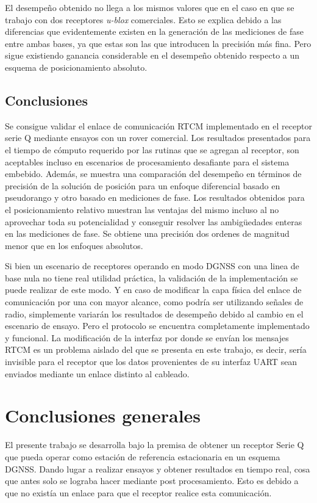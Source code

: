 \documentclass[a4paper,12pt,oneside,onecolumn,final,openright]{book}%
\begin{document}
	El desempeño obtenido no llega a los mismos valores que en el caso en que se trabajo con dos receptores \textit{u-blox} comerciales. Esto se explica debido a las diferencias que evidentemente existen en la generación de las mediciones de fase entre ambas bases, ya que estas son las que introducen la precisión más fina. Pero sigue existiendo ganancia considerable en el desempeño obtenido respecto a un esquema de posicionamiento absoluto.
\section{Conclusiones}
	Se consigue validar el enlace de comunicación RTCM implementado en el receptor serie Q mediante ensayos con un rover comercial. Los resultados presentados para el tiempo de cómputo requerido por las rutinas que se agregan al receptor, son aceptables incluso en escenarios de procesamiento desafiante para el sistema embebido. Además, se muestra una comparación del desempeño en términos de precisión de la solución de posición para un enfoque diferencial basado en pseudorango y otro basado en mediciones de fase. Los resultados obtenidos para el posicionamiento relativo muestran las ventajas del mismo incluso al no aprovechar toda su potencialidad y conseguir resolver las ambigüedades enteras en las mediciones de fase. Se obtiene una precisión dos ordenes de magnitud menor que en los enfoques absolutos.
	
	Si bien un escenario de receptores operando en modo DGNSS con una linea de base nula no tiene real utilidad práctica, la validación de la implementación se puede realizar de este modo. Y en caso de modificar la capa física del enlace de comunicación por una con mayor alcance, como podría ser utilizando señales de radio, simplemente variarán los resultados de desempeño debido al cambio en el escenario de ensayo. Pero el protocolo se encuentra completamente implementado y funcional. La modificación de la interfaz por donde se envían los mensajes RTCM es un problema aislado del que se presenta en este trabajo, es decir, sería invisible para el receptor que los datos provenientes de su interfaz UART sean enviados mediante un enlace distinto al cableado.
\chapter*{Conclusiones generales}\label{ch:conclusion}
	El presente trabajo se desarrolla bajo la premisa de obtener un receptor Serie Q que pueda operar como estación de referencia estacionaria en un esquema DGNSS. Dando lugar a realizar ensayos y obtener resultados en tiempo real, cosa que antes solo se lograba hacer mediante post procesamiento. Esto es debido a que no existía un enlace para que el receptor realice esta comunicación. 
	
\end{document}
